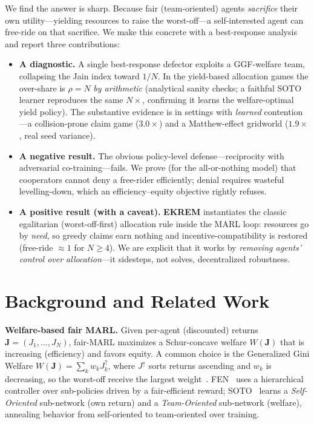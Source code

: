 \documentclass[conference, a4paper]{IEEEtran}
\begin{document}
We find the answer is sharp. Because fair (team-oriented) agents
\emph{sacrifice} their own utility---yielding resources to raise the worst-off---a
self-interested agent can free-ride on that sacrifice. We make this concrete with
a best-response analysis and report three contributions:
\begin{itemize}
\item \textbf{A diagnostic.} A single best-response defector exploits a
GGF-welfare team, collapsing the Jain index toward $1/N$. In the yield-based
allocation games the over-share is $\rho{=}N$ \emph{by arithmetic} (analytical
sanity checks; a faithful SOTO learner reproduces the same $N\times$, confirming
it learns the welfare-optimal yield policy). The substantive evidence is in
settings with \emph{learned} contention---a collision-prone claim game
($3.0\times$) and a Matthew-effect gridworld ($1.9\times$, real seed variance).
\item \textbf{A negative result.} The obvious policy-level defense---reciprocity
with adversarial co-training---fails. We prove (for the all-or-nothing model) that
cooperators cannot deny a free-rider efficiently; denial requires wasteful
levelling-down, which an efficiency--equity objective rightly refuses.
\item \textbf{A positive result (with a caveat).} \textbf{EKREM} instantiates the
classic egalitarian (worst-off-first) allocation rule inside the MARL loop:
resources go by \emph{need}, so greedy claims earn nothing and
incentive-compatibility is restored (free-ride $\approx 1$ for $N\ge 4$). We are
explicit that it works by \emph{removing agents' control over allocation}---it
sidesteps, not solves, decentralized robustness.
\end{itemize}

\section{Background and Related Work}
\textbf{Welfare-based fair MARL.} Given per-agent (discounted) returns
$\mathbf{J}=(J_1,\dots,J_N)$, fair-MARL maximizes a Schur-concave welfare
$W(\mathbf{J})$ that is increasing (efficiency) and favors equity. A common choice
is the Generalized Gini Welfare $W(\mathbf{J})=\sum_{k} w_k J^{\uparrow}_k$, where
$J^{\uparrow}$ sorts returns ascending and $w_k$ is decreasing, so the worst-off
receive the largest weight~\cite{siddique2020ggf}. FEN~\cite{jiang2019fen} uses a
hierarchical controller over sub-policies driven by a fair-efficient reward;
SOTO~\cite{zimmer2021soto} learns a \emph{Self-Oriented} sub-network (own return)
and a \emph{Team-Oriented} sub-network (welfare), annealing behavior from
self-oriented to team-oriented over training.
\end{document}
